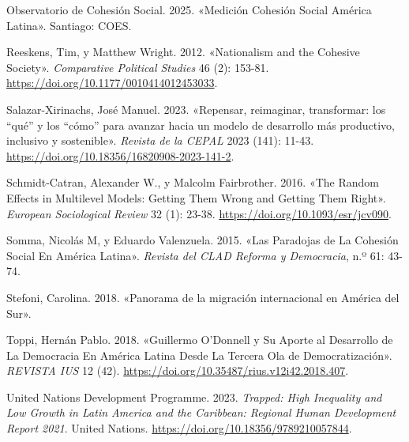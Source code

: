 \documentclass[
  spanish,
  letterpaper,
  DIV=11,
  numbers=noendperiod]{scrartcl}
\newlength{\cslhangindent}
\newenvironment{CSLReferences}[2] %
 {\begin{list}{}{%
  \setlength{\itemindent}{0pt}
  \setlength{\leftmargin}{0pt}
  \setlength{\parsep}{0pt}
  \ifodd #1
   \setlength{\leftmargin}{\cslhangindent}
   \setlength{\itemindent}{-1\cslhangindent}
  \fi
  \setlength{\itemsep}{#2\baselineskip}}}
 {\end{list}}
\begin{document}
\begin{CSLReferences}{1}{0}
Observatorio de Cohesión Social. 2025. {«Medici{ó}n {Cohesi{ó}n Social
Am{é}rica Latina}»}. Santiago: COES.

Reeskens, Tim, y Matthew Wright. 2012. {«Nationalism and the {Cohesive
Society}»}. \emph{Comparative Political Studies} 46 (2): 153-81.
\url{https://doi.org/10.1177/0010414012453033}.

Salazar-Xirinachs, José Manuel. 2023. {«{Repensar, reimaginar,
transformar: los {``qu{é}''} y los {``c{ó}mo''} para avanzar hacia un
modelo de desarrollo m{á}s productivo, inclusivo y sostenible}»}.
\emph{Revista de la CEPAL} 2023 (141): 11-43.
\url{https://doi.org/10.18356/16820908-2023-141-2}.

Schmidt-Catran, Alexander W., y Malcolm Fairbrother. 2016. {«The {Random
Effects} in {Multilevel Models}: {Getting Them Wrong} and {Getting Them
Right}»}. \emph{European Sociological Review} 32 (1): 23-38.
\url{https://doi.org/10.1093/esr/jcv090}.

Somma, Nicolás M, y Eduardo Valenzuela. 2015. {«Las {Paradojas} de {La
Cohesi{ó}n Social En Am{é}rica Latina}»}. \emph{Revista del CLAD Reforma
y Democracia}, n.º 61: 43-74.

Stefoni, Carolina. 2018. {«{Panorama de la migraci{ó}n internacional en
Am{é}rica del Sur}»}.

Toppi, Hernán Pablo. 2018. {«Guillermo {O}'{Donnell} y Su Aporte al
Desarrollo de La Democracia En {Am{é}rica Latina} Desde La Tercera Ola
de Democratizaci{ó}n»}. \emph{REVISTA IUS} 12 (42).
\url{https://doi.org/10.35487/rius.v12i42.2018.407}.

United Nations Development Programme. 2023. \emph{Trapped: {High
Inequality} and {Low Growth} in {Latin America} and the {Caribbean}:
{Regional Human Development Report} 2021}. United Nations.
\url{https://doi.org/10.18356/9789210057844}.

\end{CSLReferences}
\end{document}
